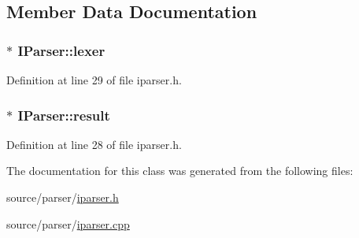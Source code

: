 \subsection{Member Data Documentation}
\hypertarget{class_i_parser_a2c89fe9ae1c200eda69c78f7441dea00}{
\subsubsection[{lexer}]{$\ast$ {\bf IParser::lexer}}}
\label{class_i_parser_a2c89fe9ae1c200eda69c78f7441dea00}


Definition at line 29 of file iparser.h.

\hypertarget{class_i_parser_a525c62c560492ef3bdb1a21c4da13e04}{
\subsubsection[{result}]{$\ast$ {\bf IParser::result}}}
\label{class_i_parser_a525c62c560492ef3bdb1a21c4da13e04}


Definition at line 28 of file iparser.h.



The documentation for this class was generated from the following files:\begin{DoxyCompactItemize}
\item 
source/parser/\hyperlink{iparser_8h}{iparser.h}\item 
source/parser/\hyperlink{iparser_8cpp}{iparser.cpp}\end{DoxyCompactItemize}
